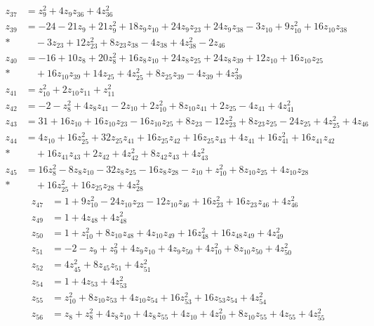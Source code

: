 \begin{align*}
z_{37}&=z_{9}^{2}+4z_{9} z_{36}+4z_{36}^{2}\\[3pt]
z_{39}&=-24-21z_{9}+21z_{9}^{2}+18z_{9} z_{10}+24z_{9} z_{23}+24z_{9} z_{38}-3z_{10}+9z_{10}^{2}+16z_{10} z_{38}\\*
&\quad{}-3z_{23}+12z_{23}^{2}+8z_{23} z_{38}-4z_{38}+4z_{38}^{2}-2z_{46}\\[3pt]
z_{40}&=-16+10z_{8}+20z_{8}^{2}+16z_{8} z_{10}+24z_{8} z_{25}+24z_{8} z_{39}+12z_{10}+16z_{10} z_{25}\\*
&\quad{}+16z_{10} z_{39}+14z_{25}+4z_{25}^{2}+8z_{25} z_{39}-4z_{39}+4z_{39}^{2}\\[3pt]
z_{41}&=z_{10}^{2}+2z_{10} z_{11}+z_{11}^{2}\\[3pt]
z_{42}&=-2-z_{8}^{2}+4z_{8} z_{41}-2z_{10}+2z_{10}^{2}+8z_{10} z_{41}+2z_{25}-4z_{41}+4z_{41}^{2}\\[3pt]
z_{43}&=31+16z_{10}+16z_{10} z_{23}-16z_{10} z_{25}+8z_{23}-12z_{23}^{2}+8z_{23} z_{25}-24z_{25}+4z_{25}^{2}+4z_{46}\\[3pt]
z_{44}&=4z_{10}+16z_{25}^{2}+32z_{25} z_{41}+16z_{25} z_{42}+16z_{25} z_{43}+4z_{41}+16z_{41}^{2}+16z_{41} z_{42}\\*
&\quad{}+16z_{41} z_{43}+2z_{42}+4z_{42}^{2}+8z_{42} z_{43}+4z_{43}^{2}\\[3pt]
z_{45}&=16z_{8}^{2}-8z_{8} z_{10}-32z_{8} z_{25}-16z_{8} z_{28}-z_{10}+z_{10}^{2}+8z_{10} z_{25}+4z_{10} z_{28}\\*
&\quad{}+16z_{25}^{2}+16z_{25} z_{28}+4z_{28}^{2}
\end{align*}
\begin{align*}
z_{47}&=1+9z_{10}^{2}-24z_{10} z_{23}-12z_{10} z_{46}+16z_{23}^{2}+16z_{23} z_{46}+4z_{46}^{2}\\[3pt]
z_{49}&=1+4z_{48}+4z_{48}^{2}\\[3pt]
z_{50}&=1+z_{10}^{2}+8z_{10} z_{48}+4z_{10} z_{49}+16z_{48}^{2}+16z_{48} z_{49}+4z_{49}^{2}\\[3pt]
z_{51}&=-2-z_{9}+z_{9}^{2}+4z_{9} z_{10}+4z_{9} z_{50}+4z_{10}^{2}+8z_{10} z_{50}+4z_{50}^{2}\\[3pt]
z_{52}&=4z_{45}^{2}+8z_{45} z_{51}+4z_{51}^{2}\\[3pt]
z_{54}&=1+4z_{53}+4z_{53}^{2}\\[3pt]
z_{55}&=z_{10}^{2}+8z_{10} z_{53}+4z_{10} z_{54}+16z_{53}^{2}+16z_{53} z_{54}+4z_{54}^{2}\\[3pt]
z_{56}&=z_{8}+z_{8}^{2}+4z_{8} z_{10}+4z_{8} z_{55}+4z_{10}+4z_{10}^{2}+8z_{10} z_{55}+4z_{55}+4z_{55}^{2}
\end{align*}

